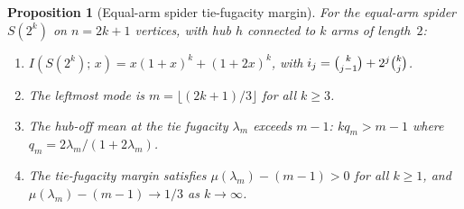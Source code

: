 \documentclass[12pt,oneside]{article}
\newtheorem{proposition}[theorem]{Proposition}
\theoremstyle{remark}
\begin{document}
\begin{proposition}[Equal-arm spider tie-fugacity margin]\label{prop:spider-tie-margin}
  For the equal-arm spider $S(2^k)$ on $n = 2k+1$ vertices, with hub $h$ connected to $k$ arms of length~$2$:
  \begin{enumerate}
    \item $I(S(2^k);\, x) = x(1+x)^k + (1+2x)^k$, with $i_j = \tbinom{k}{j-1} + 2^j\tbinom{k}{j}$.
    \item The leftmost mode is $m = \lfloor(2k+1)/3\rfloor$ for all $k \ge 3$.
    \item The hub-off mean at the tie fugacity $\lambda_m$ exceeds $m-1$: $kq_m > m-1$ where $q_m = 2\lambda_m/(1+2\lambda_m)$.
    \item The tie-fugacity margin satisfies $\mu(\lambda_m) - (m-1) > 0$ for all $k \ge 1$, and
          $\mu(\lambda_m) - (m-1) \to 1/3$ as $k \to \infty$.
  \end{enumerate}
\end{proposition}
\end{document}
